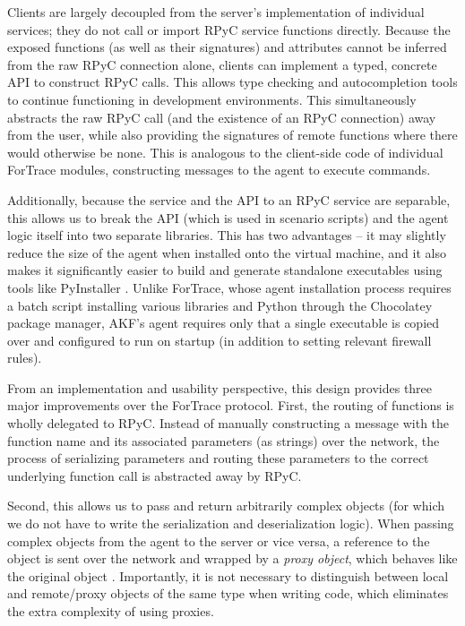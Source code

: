 Clients are largely decoupled from the server's implementation of
individual services; they do not call or import RPyC service functions
directly. Because the exposed functions (as well as their signatures)
and attributes cannot be inferred from the raw RPyC connection alone,
clients can implement a typed, concrete API to construct RPyC calls.
This allows type checking and autocompletion tools to continue
functioning in development environments. This simultaneously abstracts
the raw RPyC call (and the existence of an RPyC connection) away from
the user, while also providing the signatures of remote functions where
there would otherwise be none. This is analogous to the client-side code
of individual ForTrace modules, constructing messages to the agent to
execute commands.

Additionally, because the service and the API to an RPyC service are
separable, this allows us to break the API (which is used in scenario
scripts) and the agent logic itself into two separate libraries. This
has two advantages -- it may slightly reduce the size of the agent when
installed onto the virtual machine, and it also makes it significantly
easier to build and generate standalone executables using tools like
PyInstaller \cite{PyinstallerPyinstaller2025}. Unlike ForTrace,
whose agent installation process requires a batch script installing
various libraries and Python through the Chocolatey package manager,
AKF's agent requires only that a single executable is copied over and
configured to run on startup (in addition to setting relevant firewall
rules).

From an implementation and usability perspective, this design provides
three major improvements over the ForTrace protocol. First, the routing
of functions is wholly delegated to RPyC. Instead of manually
constructing a message with the function name and its associated
parameters (as strings) over the network, the process of serializing
parameters and routing these parameters to the correct underlying
function call is abstracted away by RPyC.

Second, this allows us to pass and return arbitrarily complex objects
(for which we do not have to write the serialization and deserialization
logic). When passing complex objects from the agent to the server or
vice versa, a reference to the object is sent over the network and
wrapped by a \emph{proxy object}, which behaves like the original object
\cite{TheoryOperationRPyC}. Importantly, it is not necessary to
distinguish between local and remote/proxy objects of the same type when
writing code, which eliminates the extra complexity of using proxies.

